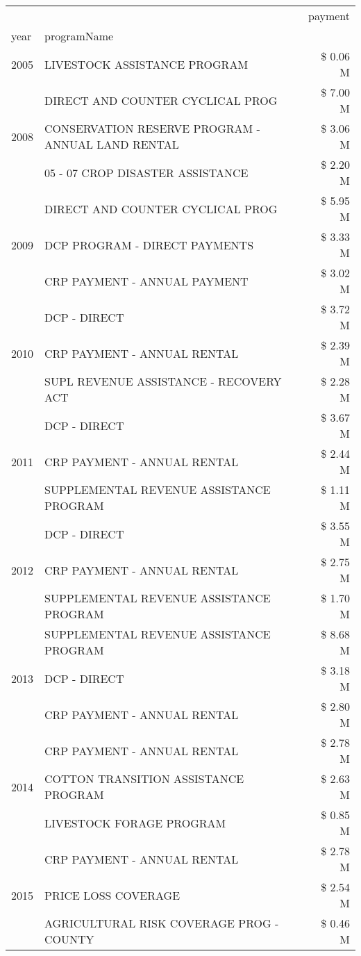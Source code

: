 \begin{tabular}{llr}
\toprule
 &  & payment \\
year & programName &  \\
\midrule
2005 & LIVESTOCK ASSISTANCE PROGRAM & \$ 0.06 M \\
\cline{1-3}
\multirow[t]{3}{*}{2008} & DIRECT AND COUNTER CYCLICAL PROG & \$ 7.00 M \\
 & CONSERVATION RESERVE PROGRAM - ANNUAL LAND RENTAL & \$ 3.06 M \\
 & 05 - 07 CROP DISASTER ASSISTANCE & \$ 2.20 M \\
\cline{1-3}
\multirow[t]{3}{*}{2009} & DIRECT AND COUNTER CYCLICAL PROG & \$ 5.95 M \\
 & DCP PROGRAM - DIRECT PAYMENTS & \$ 3.33 M \\
 & CRP PAYMENT - ANNUAL PAYMENT & \$ 3.02 M \\
\cline{1-3}
\multirow[t]{3}{*}{2010} & DCP - DIRECT & \$ 3.72 M \\
 & CRP PAYMENT - ANNUAL RENTAL & \$ 2.39 M \\
 & SUPL REVENUE ASSISTANCE - RECOVERY ACT & \$ 2.28 M \\
\cline{1-3}
\multirow[t]{3}{*}{2011} & DCP - DIRECT & \$ 3.67 M \\
 & CRP PAYMENT - ANNUAL RENTAL & \$ 2.44 M \\
 & SUPPLEMENTAL REVENUE ASSISTANCE PROGRAM & \$ 1.11 M \\
\cline{1-3}
\multirow[t]{3}{*}{2012} & DCP - DIRECT & \$ 3.55 M \\
 & CRP PAYMENT - ANNUAL RENTAL & \$ 2.75 M \\
 & SUPPLEMENTAL REVENUE ASSISTANCE PROGRAM & \$ 1.70 M \\
\cline{1-3}
\multirow[t]{3}{*}{2013} & SUPPLEMENTAL REVENUE ASSISTANCE PROGRAM & \$ 8.68 M \\
 & DCP - DIRECT & \$ 3.18 M \\
 & CRP PAYMENT - ANNUAL RENTAL & \$ 2.80 M \\
\cline{1-3}
\multirow[t]{3}{*}{2014} & CRP PAYMENT - ANNUAL RENTAL & \$ 2.78 M \\
 & COTTON TRANSITION ASSISTANCE PROGRAM & \$ 2.63 M \\
 & LIVESTOCK FORAGE PROGRAM & \$ 0.85 M \\
\cline{1-3}
\multirow[t]{3}{*}{2015} & CRP PAYMENT - ANNUAL RENTAL & \$ 2.78 M \\
 & PRICE LOSS COVERAGE & \$ 2.54 M \\
 & AGRICULTURAL RISK COVERAGE PROG - COUNTY & \$ 0.46 M \\

\end{tabular}
